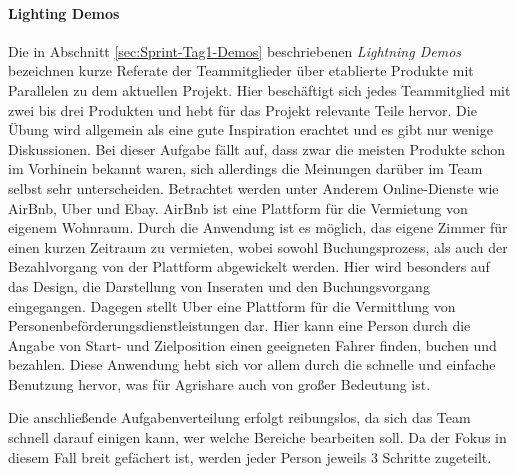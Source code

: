 \paragraph{Lighting Demos}
%
Die in Abschnitt \ref{sec:Sprint-Tag1-Demos} beschriebenen \textit{Lightning Demos} bezeichnen kurze Referate der Teammitglieder über etablierte Produkte mit Parallelen zu dem aktuellen Projekt. 
Hier beschäftigt sich jedes Teammitglied mit zwei bis drei Produkten und hebt für das Projekt relevante Teile hervor. Die Übung wird allgemein als eine gute Inspiration erachtet und es gibt nur wenige Diskussionen. 
Bei dieser Aufgabe fällt auf, dass zwar die meisten Produkte schon im Vorhinein bekannt waren, sich allerdings die Meinungen darüber im Team selbst sehr unterscheiden. Betrachtet werden unter Anderem Online-Dienste wie AirBnb, Uber und Ebay. AirBnb ist eine Plattform für die Vermietung von eigenem Wohnraum. Durch die Anwendung ist es möglich, das eigene Zimmer für einen kurzen Zeitraum zu vermieten, wobei sowohl Buchungsprozess, als auch der Bezahlvorgang von der Plattform abgewickelt werden. Hier wird besonders auf das Design, die Darstellung von Inseraten und den Buchungsvorgang eingegangen. Dagegen stellt Uber eine Plattform für die Vermittlung von Personenbeförderungsdienstleistungen dar. Hier kann eine Person durch die Angabe von Start- und Zielposition einen geeigneten Fahrer finden, buchen und bezahlen. Diese Anwendung hebt sich vor allem durch die schnelle und einfache Benutzung hervor, was für Agrishare auch von großer Bedeutung ist.

Die anschließende Aufgabenverteilung erfolgt reibungslos, da sich das Team schnell darauf einigen kann, wer welche Bereiche bearbeiten soll. Da der Fokus in diesem Fall breit gefächert ist, werden jeder Person jeweils 3 Schritte zugeteilt.

